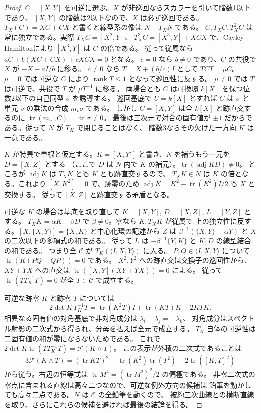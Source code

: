 \begin{proof}
$C=[X,Y]$ を可逆に選ぶ。$X$ が非巡回ならスカラーを引いて階数1以下であり、
$[X,Y]$ の階数は2以下なので、$X$ は必ず巡回である。
$T_X(C)=XC+CX$ と書くと線型系の像は $N+T_X N$ である。
$C,T_X C,T_X^2 C$ は常に独立である。実際 $T_X C=[X^2,Y]$、
$T_X^2 C=[X^3,Y]+XCX$ で、Cayley--Hamiltonにより $[X^3,Y]$ は $C$ の倍である。
従って従属なら $a C+b(XC+CX)+cXCX=0$ となる。
$c=0$ なら $b\ne0$ であり、$C$ の共役で $X$ が $-X-aI/b$ に移る。
$c\ne0$ なら $T=X+(b/c)I$ として $TCT=\mu C$。
$\mu=0$ では可逆な $C$ により $\operatorname{rank}T\le1$ となって巡回性に反する。
$\mu\ne0$ では $T$ は可逆で、共役で $T$ が $\mu T^{-1}$ に移る。
両場合とも $C$ は可換環 $k[X]$ を保つ位数2以下の自己同型 $\sigma$ を誘導する。
巡回基底で $U=k[X]$ とすれば $C$ は $\sigma$ と単元 $v$ の乗法の合成 $m_v\sigma$ である。
しかし $C=[X,Y]$ は全 $k[X]$ と跡直交するのに
$\operatorname{tr}(m_{v^{-1}}C)=\operatorname{tr}\sigma\ne0$。
最後は三次元で対合の固有値が $\pm1$ だからである。従って $N$ が $T_X$ で閉じることはなく、
階数3ならその欠けた一方向 $K$ は一意である。

$K$ が特異で単根と仮定する。$K=[X,Y']$ と書き、$N$ を補うもう一元を $D=[X,Z]$ とする
（ここで $D$ は $N$ 内で $K$ の補元）。$\operatorname{tr}(\operatorname{adj}K D)\ne0$。
ところが $\operatorname{adj}K$ は $T_X K$ とも $K$ とも跡直交するので、
$T_X K\in N$ は $K$ の倍となる。これより $[X,K^2]=0$ で、跡零のため
$\operatorname{adj}K=K^2-\operatorname{tr}(K^2)I/2$ も $X$ と交換する。
従って $[X,Z]$ と跡直交する矛盾となる。

可逆な $K$ の場合は基底を取り直して $K=[X,Y]$, $D=[X,Z]$, $L=[Y,Z]$ とする。
$T_X K=\alpha K+\beta D$ で $\beta\ne0$。零なら $K,T_X K$ が従属で
上の独立性に反する。$[X,\{X,Y\}]=\{X,K\}$ と中心化環の記述から
$Z$ は $\beta^{-1}(\{X,Y\}-\alpha Y)$ と $X$ の二次以下の多項式の和である。
従って $L$ は $-\beta^{-1}\{Y,K\}$ と $K,D$ の線型結合の和である。
つまり全 $\mathcal C$ が $T_K(\langle I,X,Y\rangle)$ に入る。
$P,Q\in\langle I,X,Y\rangle$ について $\operatorname{tr}(K(PQ+QP))=0$ である。
$X^2,Y^2$ への跡直交は交換子の巡回性から、
$XY+YX$ への直交は $\operatorname{tr}([X,Y](XY+YX))=0$ による。
従って $\operatorname{tr}(T T_K^{-1}T)=0$ が全 $T\in\mathcal C$ で成立する。

可逆な跡零 $K$ と跡零 $T$ については
\[
 2\det K\,T_K^{-1}T=\operatorname{tr}(K^2T)I+
                         \operatorname{tr}(KT)K-2KTK .
\]
相異なる固有値の対角基底で非対角成分は $\lambda_i+\lambda_j=-\lambda_k$、
対角成分はスペクトル射影の二次式から得られ、分母を払えば全元で成立する。
$T_K$ 自体の可逆性は二固有値の和が零にならないためである。
これで $2\det K\operatorname{tr}(T T_K^{-1}T)=\mathcal F(K\wedge T)$。
この表示が外積の二次式であることは
\[
 3\mathcal F(K\wedge T)=(\operatorname{tr} KT)^2-
 \operatorname{tr}(K^2)\operatorname{tr}(T^2)-2\operatorname{tr}([K,T]^2)
\]
から従う。右辺の恒等式は $\operatorname{tr} M^4=(\operatorname{tr}M^2)^2/2$ の偏極である。
非零二次式の零点に含まれる直線は高々二つなので、可逆な例外方向の候補は
鉛筆を動かしても高々二点である。$N$ は $\mathcal C$ の全鉛筆を動くので、
被約三次曲線との横断直線を取り、さらにこれらの候補を避ければ最後の結論を得る。
\end{proof}

